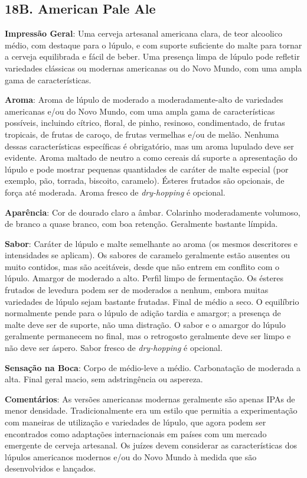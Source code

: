 \subsection*{18B. American Pale Ale}
\textbf{Impressão Geral}: Uma cerveja artesanal americana clara, de teor alcoolico médio, com destaque para o lúpulo, e com suporte suficiente do malte para tornar a cerveja equilibrada e fácil de beber. Uma presença limpa de lúpulo pode refletir variedades clássicas ou modernas americanas ou do Novo Mundo, com uma ampla gama de características.

\textbf{Aroma}: Aroma de lúpulo de moderado a moderadamente-alto de variedades americanas e/ou do Novo Mundo, com uma ampla gama de características possíveis, incluindo cítrico, floral, de pinho, resinoso, condimentado, de frutas tropicais, de frutas de caroço, de frutas vermelhas e/ou de melão. Nenhuma dessas características específicas é obrigatório, mas um aroma lupulado deve ser evidente. Aroma maltado de neutro a como cereais dá suporte a apresentação do lúpulo e pode mostrar pequenas quantidades de caráter de malte especial (por exemplo, pão, torrada, biscoito, caramelo). Ésteres frutados são opcionais, de força até moderada. Aroma fresco de \textit{dry-hopping} é opcional.

\textbf{Aparência}: Cor de dourado claro a âmbar. Colarinho moderadamente volumoso, de branco a quase branco, com boa retenção. Geralmente bastante límpida.

\textbf{Sabor}: Caráter de lúpulo e malte semelhante ao aroma (os mesmos descritores e intensidades se aplicam). Os sabores de caramelo geralmente estão ausentes ou muito contidos, mas são aceitáveis, desde que não entrem em conflito com o lúpulo. Amargor de moderado a alto. Perfil limpo de fermentação. Os ésteres frutados de levedura podem ser de moderados a nenhum, embora muitas variedades de lúpulo sejam bastante frutadas. Final de médio a seco. O equilíbrio normalmente pende para o lúpulo de adição tardia e amargor; a presença de malte deve ser de suporte, não uma distração. O sabor e o amargor do lúpulo geralmente permanecem no final, mas o retrogosto geralmente deve ser limpo e não deve ser áspero. Sabor fresco de \textit{dry-hopping} é opcional.

\textbf{Sensação na Boca}: Corpo de médio-leve a médio. Carbonatação de moderada a alta. Final geral macio, sem adstringência ou aspereza.

\textbf{Comentários}: As versões americanas modernas geralmente são apenas IPAs de menor densidade. Tradicionalmente era um estilo que permitia a experimentação com maneiras de utilização e variedades de lúpulo, que agora podem ser encontrados como adaptações internacionais em países com um mercado emergente de cerveja artesanal. Os juízes devem considerar as características dos lúpulos americanos modernos e/ou do Novo Mundo à medida que são desenvolvidos e lançados.

